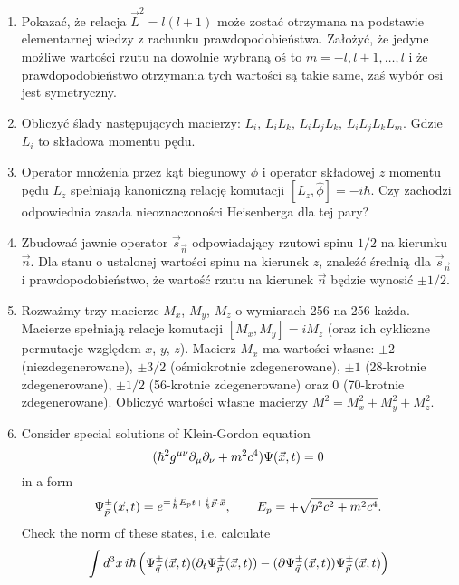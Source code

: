 \documentclass[a4paper,11pt]{article}
\begin{document}
\begin{enumerate}
\item Pokazać, że relacja $\vec{ L }^{ 2 } = l ( l + 1 )$ może zostać
  otrzymana na podstawie elementarnej wiedzy z rachunku
  prawdopodobieństwa. Założyć, że jedyne możliwe wartości rzutu na
  dowolnie wybraną oś to $m = -l, l + 1, \ldots, l$ i że
  prawdopodobieństwo otrzymania tych wartości są takie same, zaś wybór
  osi jest symetryczny.

\item Obliczyć ślady następujących macierzy: $L_{ i }$,
  $L_{ i } L_{ k }$, $L_{ i } L_{ j } L_{ k }$,
  $L_{ i } L_{ j } L_{ k } L_{ m }$. Gdzie $L_{ i }$ to składowa
  momentu pędu.

\item Operator mnożenia przez kąt biegunowy $\phi$ i operator
  składowej $z$ momentu pędu $L_{ z }$ spełniają kanoniczną relację
  komutacji $[ L_{ z }, \widehat{ \phi } ] = -i\hbar$. Czy zachodzi
  odpowiednia zasada nieoznaczoności Heisenberga dla tej pary?

\item Zbudować jawnie operator $\vec{ s }_{ \vec{ n } }$ odpowiadający
  rzutowi spinu $1 / 2$ na kierunku $\vec{ n }$. Dla stanu o ustalonej
  wartości spinu na kierunek $z$, znaleźć średnią dla
  $\vec{ s }_{ \vec{ n } }$ i prawdopodobieństwo, że wartość rzutu na
  kierunek $\vec{ n }$ będzie wynosić $\pm 1 / 2$.

\item Rozważmy trzy macierze $M_{ x }$, $M_{ y }$, $M_{ z }$ o
  wymiarach 256 na 256 każda. Macierze spełniają relacje komutacji
  $[ M_{ x }, M_{ y } ] = i M_{ z }$ (oraz ich cykliczne permutacje
  względem $x$, $y$, $z$). Macierz $M_{ x }$ ma wartości własne:
  $\pm 2$ (niezdegenerowane), $\pm 3 / 2$ (ośmiokrotnie
  zdegenerowane), $\pm 1$ (28-krotnie zdegenerowane), $\pm 1 / 2$
  (56-krotnie zdegenerowane) oraz 0 (70-krotnie zdegenerowane).
  Obliczyć wartości własne macierzy
  $M^{ 2 } = M_{ x }^{ 2 } + M_{ y }^{ 2 } + M_{ z }^{ 2 }$.

\item Consider special solutions of Klein-Gordon equation
  \begin{equation}
    \label{eq:4}
    ( \hbar^{ 2 } g^{ \mu \nu } \partial_{ \mu } \partial_{ \nu } + m^{ 2 } c^{ 4 } ) \Psi( \vec{ x }, t )
    = 0
  \end{equation}
  in a form
  \begin{equation}
    \label{eq:5}
    \Psi^{ \pm }_{ \vec{ p } }( \vec{ x }, t ) =
    e^{ \mp \frac{ i }{ \hbar } E_{ p } t + \frac{ i }{ \hbar } \vec{ p } \cdot \vec{ x } }, \qquad
    E_{ p } = +\sqrt{ \vec{ p }^{ 2 } c^{ 2 } + m^{ 2 } c^{ 4 } }.
  \end{equation}
  Check the norm of these states, i.e. calculate
  \begin{equation}
    \label{eq:11}
    \int d^{ 3 } x \, i \hbar
    \left( \Psi^{ \pm }_{ \vec{ q } }( \vec{ x }, t )
      ( \partial_{ t } \Psi^{ \pm }_{ \vec{ p } }( \vec{ x }, t ) )
      - ( \partial \Psi^{ \pm }_{ \vec{ q } }( \vec{ x }, t ) ) \Psi^{ \pm }_{ \vec{ p } }( \vec{ x }, t )
    \right)
  \end{equation}


\end{enumerate}
\end{document}
